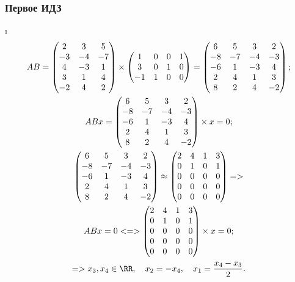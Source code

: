 \subsubsection{Первое ИДЗ}

\i
\begin{gather*}
    AB = \begin{pmatrix}
        2 & 3 & 5\\
        -3 & -4 & -7\\
        4 & -3 & 1\\
        3 & 1 & 4\\
        -2 & 4 & 2
    \end{pmatrix} \times \begin{pmatrix}
        1 & 0 & 0 & 1\\
        3 & 0 & 1 & 0\\
        -1 & 1 & 0 & 0
    \end{pmatrix} = \begin{pmatrix}
        6 & 5 & 3 & 2\\
        -8 & -7 & -4 & -3\\
        -6 & 1 & -3 & 4\\
        2 & 4 & 1 & 3\\
        8 & 2 & 4 & -2
    \end{pmatrix};\\
    ABx = \begin{pmatrix}
        6 & 5 & 3 & 2\\
        -8 & -7 & -4 & -3\\
        -6 & 1 & -3 & 4\\
        2 & 4 & 1 & 3\\
        8 & 2 & 4 & -2
    \end{pmatrix} \times x = 0;\\
    \begin{pmatrix}
        6 & 5 & 3 & 2\\
        -8 & -7 & -4 & -3\\
        -6 & 1 & -3 & 4\\
        2 & 4 & 1 & 3\\
        8 & 2 & 4 & -2
    \end{pmatrix} \approx \begin{pmatrix}
        2 & 4 & 1 & 3\\
        0 & 1 & 0 & 1\\
        0 & 0 & 0 & 0\\
        0 & 0 & 0 & 0\\
        0 & 0 & 0 & 0
    \end{pmatrix} => \\
    ABx = 0 <=> \begin{pmatrix}
        2 & 4 & 1 & 3\\
        0 & 1 & 0 & 1\\
        0 & 0 & 0 & 0\\
        0 & 0 & 0 & 0\\
        0 & 0 & 0 & 0
    \end{pmatrix} \times x = 0;\\
    => x_3, x_4 \in \RR, \quad x_2 = -x_4, \quad x_1 = \frac{x_4 - x_3}{2}.
\end{gather*}


